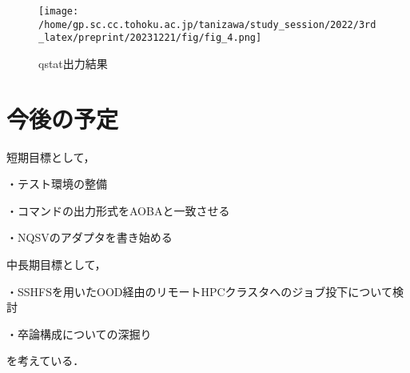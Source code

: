 \documentclass[a4paper,oneside,twocolumn,notitlepage,dvipdfmx]{jsarticle}
\begin{document}
\begin{figure}[h]
  \centering
  \texttt{[image: /home/gp.sc.cc.tohoku.ac.jp/tanizawa/study\_session/2022/3rd\_latex/preprint/20231221/fig/fig\_4.png]}
  \caption{qstat出力結果}
  \label{fig_4}
\end{figure}

\section{今後の予定}
短期目標として，\par
・テスト環境の整備\par
・コマンドの出力形式をAOBAと一致させる\par
\qquad・NQSVのアダプタを書き始める\par
中長期目標として，\par
・SSHFSを用いたOOD経由のリモートHPCクラスタへのジョブ投下について検討\par
・卒論構成についての深掘り\par
を考えている．\par



\end{document}
